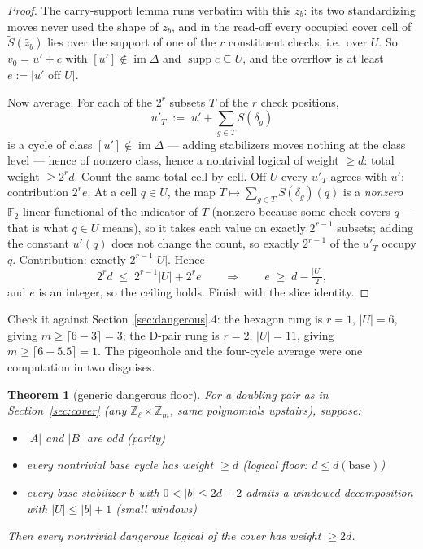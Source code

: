 \documentclass[11pt]{article}
\theoremstyle{plain}
\newtheorem{theorem}{Theorem}[section]
\theoremstyle{definition}
\theoremstyle{remark}
\newcommand{\F}{\mathbb{F}}
\newcommand{\Z}{\mathbb{Z}}
\newcommand{\suppop}{\operatorname{supp}}
\newcommand{\imD}{\operatorname{im}\Delta}
\newcommand{\base}{\mathrm{base}}
\newcommand{\wt}[1]{\lvert #1\rvert}
\begin{document}
\begin{proof}
The carry-support lemma runs verbatim with this $z_b$: its two
standardizing moves never used the shape of $z_b$, and in the read-off
every occupied cover cell of $\widetilde S(\widetilde{z_b})$ lies over the
support of one of the $r$ constituent checks, i.e.\ over $U$. So $v_0 = u' + c$ with
$[u'] \notin \imD$ and $\suppop c \subseteq U$, and the overflow is at
least $e := \wt{u' \text{ off } U}$.

Now average. For each of the $2^r$ subsets $T$ of the $r$ check positions,
\[
u'_T \;:=\; u' + \textstyle\sum_{g \in T} S(\delta_g)
\]
is a cycle of class $[u'] \notin \imD$ --- adding stabilizers moves nothing
at the class level --- hence of nonzero class, hence a nontrivial logical of
weight $\geq d$: total weight $\geq 2^r d$. Count the same total cell by cell.
Off $U$ every $u'_T$ agrees with $u'$: contribution $2^r e$. At a cell
$q \in U$, the map $T \mapsto \sum_{g \in T} S(\delta_g)(q)$ is a
\emph{nonzero} $\F_2$-linear functional of the indicator of $T$ (nonzero
because some check covers $q$ --- that is what $q \in U$ means), so it
takes each value on exactly $2^{r-1}$ subsets; adding the constant
$u'(q)$ does not change the count, so exactly $2^{r-1}$ of the $u'_T$
occupy $q$. Contribution: exactly $2^{r-1}|U|$. Hence
\[
2^r d \;\leq\; 2^{r-1}|U| + 2^r e
\qquad\Longrightarrow\qquad
e \;\geq\; d - \tfrac{|U|}{2},
\]
and $e$ is an integer, so the ceiling holds. Finish with the slice
identity.
\end{proof}

Check it against Section~\ref{sec:dangerous}.4: the hexagon rung is
$r = 1$, $|U| = 6$, giving $m \geq \lceil 6 - 3 \rceil = 3$; the D-pair
rung is $r = 2$, $|U| = 11$, giving $m \geq \lceil 6 - 5.5 \rceil = 1$.
The pigeonhole and the four-cycle average were one computation in two
disguises.

\begin{theorem}[generic dangerous floor]\label{thm:genericfloor}
For a doubling pair as in Section~\ref{sec:cover} (any
$\Z_\ell \times \Z_m$, same polynomials upstairs), suppose:
\begin{itemize}[leftmargin=3.2em]
\item[\textbf{(P)}] $\wt{A}$ and $\wt{B}$ are odd \hfill (parity)
\item[\textbf{(F)}] every nontrivial base cycle has weight $\geq d$
  \hfill (logical floor: $d \leq d(\base)$)
\item[\textbf{(W)}] every base stabilizer $b$ with
  $0 < \wt{b} \leq 2d - 2$ admits a windowed decomposition with
  $|U| \leq \wt{b} + 1$ \hfill (small windows)
\end{itemize}
Then every nontrivial dangerous logical of the cover has weight $\geq 2d$.
\end{theorem}
\end{document}
